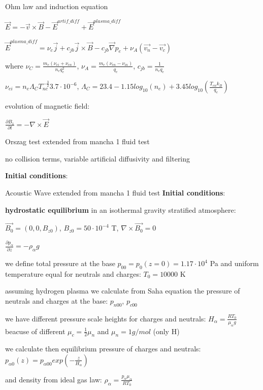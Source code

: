 \documentclass{beamer}
\begin{document}
\begin{frame}{Ohm law and induction equation}

$\vec{E} = - \vec{v} \times \vec{B} - \vec{E}^{artif\_diff} + \vec{E}^{plasma\_diff}$

$\vec{E}^{plasma\_diff} = \nu_c \vec{j} + c_{jb}  \vec{j} \times \vec{B} - c_{jb} \vec{\nabla} p_e  + \nu_A (\vec{v_n} - \vec{v_c})$

where $\nu_C = \frac{m_e(\nu_{ei}+\nu_{en})}{n_e q_e^2}$, $\nu_A= \frac{m_e(\nu_{en}-\nu_{in})}{q_e} $, $c_{jb} = \frac{1}{n_e q_e}$

$\nu_{ei} = n_e \Lambda_C T_{nc}^{-\frac{3}{2}} 3.7\cdot 10^{-6}$, $\Lambda_C = 23.4 - 1.15 log_{10}(n_e)+3.45 log_{10}(\frac{T_{cn}k_B}{q_e})$


evolution of magnetic field:

$\frac{\partial B_1}{\partial t} = - \nabla \times \vec{E}$

\end{frame}
\begin{frame}{Orszag test}
extended from mancha 1 fluid test

no collision terms, variable artificial diffusivity and filtering

\textbf{Initial conditions}:



\end{frame}
\begin{frame}{Acoustic Wave}
extended from mancha 1 fluid test
\textbf{Initial conditions}:

\textbf{hydrostatic equilibrium} in an isothermal gravity stratified atmosphere:

$\vec{B_0}=(0,0,B_{z0})$, $B_{z0} = 50 \cdot 10^{-4}$ T, $\nabla \times \vec{B_0} = 0$

$\frac{\partial p_\alpha}{\partial z} = -\rho_\alpha  g$

we define total pressure at the  base  $p_{00}= p_0(z=0)=1.17 \cdot 10^4$ Pa  and uniform temperature equal for neutrals and charges: $T_0=10000$ K

assuming hydrogen plasma we calculate from Saha equation the pressure of neutrals and charges at the base: $p_{n00}$, $p_{c00}$

we have different pressure scale heights for charges and neutrals: $H_\alpha = \frac{R T_0}{\mu_\alpha g}$ beacuse of different $\mu_c=\frac{1}{2} \mu_n$  and $\mu_n = 1g/mol$ (only H)

we calculate then equilibrium pressure of charges and neutrals: $p_{\alpha0}(z) = p_{\alpha00} exp(-\frac{z}{H_\alpha})$

and density from ideal gas law: $\rho_\alpha = \frac{p_\alpha \mu_\alpha}{R T_0}$
\end{frame}
\end{document}
